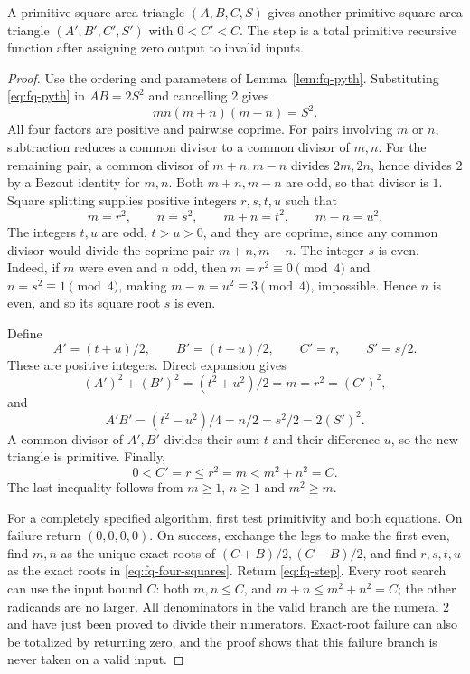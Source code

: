 \begin{lemma}\label{lem:fq-step}
A primitive square-area triangle $(A,B,C,S)$ gives another primitive
square-area triangle $(A',B',C',S')$ with $0<C'<C$.
The step is a total primitive recursive function after assigning zero
output to invalid inputs.
\end{lemma}

\begin{proof}
Use the ordering and parameters of Lemma~\ref{lem:fq-pyth}.
Substituting \eqref{eq:fq-pyth} in $AB=2S^2$ and cancelling $2$
gives
\[
 mn(m+n)(m-n)=S^2.
 \tag{F4}
\]
All four factors are positive and pairwise coprime.
For pairs involving $m$ or $n$, subtraction reduces a common divisor
to a common divisor of $m,n$.  For the remaining pair, a common divisor
of $m+n,m-n$ divides $2m,2n$, hence divides $2$ by a Bezout identity
for $m,n$.  Both $m+n,m-n$ are odd, so that divisor is $1$.
Square splitting supplies positive integers $r,s,t,u$ such that
\[
 m=r^2,\qquad n=s^2,\qquad m+n=t^2,\qquad m-n=u^2.
 \tag{F5}\label{eq:fq-four-squares}
\]
The integers $t,u$ are odd, $t>u>0$, and they are coprime, since
any common divisor would divide the coprime pair $m+n,m-n$.
The integer $s$ is even.  Indeed, if $m$ were even and $n$ odd,
then $m=r^2\equiv0\pmod4$ and $n=s^2\equiv1\pmod4$,
making $m-n=u^2\equiv3\pmod4$, impossible.  Hence $n$ is even,
and so its square root $s$ is even.

Define
\[
 A'=(t+u)/2,\qquad B'=(t-u)/2,\qquad
 C'=r,\qquad S'=s/2.
 \tag{F6}\label{eq:fq-step}
\]
These are positive integers.  Direct expansion gives
\[
 (A')^2+(B')^2=(t^2+u^2)/2=m=r^2=(C')^2,
\]
and
\[
 A'B'=(t^2-u^2)/4=n/2=s^2/2=2(S')^2.
\]
A common divisor of $A',B'$ divides their sum $t$ and their
difference $u$, so the new triangle is primitive.  Finally,
\[
 0<C'=r\leq r^2=m<m^2+n^2=C.
 \tag{F7}\label{eq:fq-decrease}
\]
The last inequality follows from $m\geq1$, $n\geq1$ and
$m^2\geq m$.

For a completely specified algorithm, first test primitivity and both
equations.  On failure return $(0,0,0,0)$.  On success, exchange the
legs to make the first even, find $m,n$ as the unique exact roots of
$(C+B)/2,(C-B)/2$, and find $r,s,t,u$ as the exact roots in
\eqref{eq:fq-four-squares}.  Return \eqref{eq:fq-step}.
Every root search can use the input bound $C$: both $m,n\leq C$,
and $m+n\leq m^2+n^2=C$; the other radicands are no larger.
All denominators in the valid branch are the numeral $2$ and have
just been proved to divide their numerators.  Exact-root failure can
also be totalized by returning zero, and the proof shows that this
failure branch is never taken on a valid input.
\end{proof}

